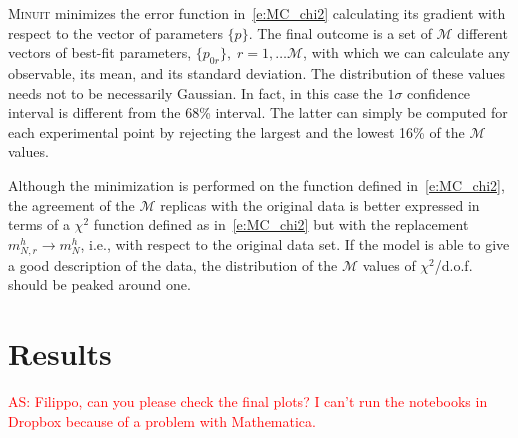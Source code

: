\documentclass[aps,preprintnumbers,showpacs,nofootinbib,superscriptaddress,floatfix]{revtex4}
\newcommand{\minuit}{\textsc{Minuit }}
\begin{document}
\minuit minimizes the error function in~\eqref{e:MC_chi2} calculating its gradient with respect to the vector of parameters $\{p\}$. 
The final outcome is a set of $\mathcal{M}$ different vectors of best-fit parameters, $\{ p_{0r}\},\; r=1,\ldots \mathcal{M}$, with which we can calculate any observable, its mean, and its standard deviation. 
The distribution of these values needs not to be necessarily Gaussian. In fact, in this case the $1 \sigma$ confidence interval is different from the 68\% interval. 
The latter can simply be computed for each experimental point by rejecting the largest and the lowest 16\% of the $\mathcal{M}$ values.   

Although the minimization is performed on the function defined in~\eqref{e:MC_chi2}, the agreement of the $\mathcal{M}$ replicas with the original data is better expressed in terms of a $\chi^2$ function defined as in~\eqref{e:MC_chi2} but with the replacement $m_{N, r}^{h} \to m_{N}^{h}$, i.e.,  with respect to the original data set. If the model is able to give a good description of the data, the distribution of the $\mathcal{M}$ values of $\chi^2$/d.o.f. should be peaked around one. 










\section{Results}
\label{s:results}

\textcolor{red}{AS: Filippo, can you please check the final plots? I can't run the notebooks in Dropbox because of a problem with Mathematica.}
\end{document}
